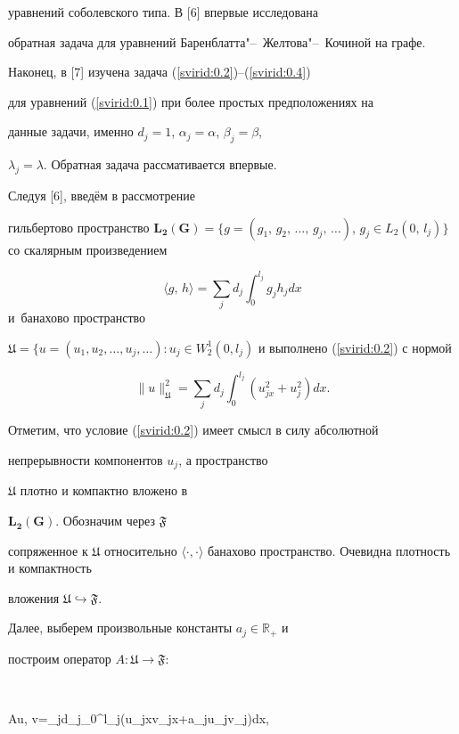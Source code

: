 уравнений соболевского типа. В [6] впервые исследована

обратная задача для уравнений Баренблатта"--~Желтова"--~Кочиной на графе.

Наконец, в [7] изучена задача (\ref{svirid:0.2})--(\ref{svirid:0.4})

для урав\-не\-ний (\ref{svirid:0.1}) при более простых предположениях на

данные задачи, именно $d_j=1$, $\alpha_j=\alpha$, $\beta_j=\beta$,

$\lambda_j=\lambda$. Обратная задача рассмативается впервые.





Следуя [6], введём в рассмотрение

гильбертово пространство $\mathbf{L_2(G)}=\{g=(g_1,\, g_2,\, \dots,\, g_j,\, \dots)$, $g_j\in L_2(0,\, l_j)\}$ со скалярным произведением

$$\langle g,\, h\rangle=\sum\limits_jd_j\int_0^{l_j}g_jh_jdx$$ и~банахово пространство

$\mathbf{\mathfrak{U}}=\{u=(u_1, u_2, \dots, u_j, \dots): u_j\in

W^1_2(0, l_j)$ и вы\-пол\-не\-но (\ref{svirid:0.2}) с нормой

$$\|u\|_{\mathbf{\mathfrak{U}}}^2=\sum\limits_jd_j\int_0^{l_j}(u^2_{jx}+u_j^2)dx.$$

Отметим, что условие (\ref{svirid:0.2}) имеет смысл в силу абсолютной

непрерывности ком\-по\-нен\-тов $u_j$, а пространство

$\mathbf{\mathfrak{U}}$ плотно и компактно вложено в

$\mathbf{L_2(G)}$. Обозначим через $\mathbb{\mathfrak{F}}$

сопряженное к $\mathbf{\mathfrak{U}}$ относительно $\langle\cdot,

\cdot\rangle$ банахово про\-стран\-ство. Очевидна плотность и компактность

вложения $\mathbf{\mathfrak{U}\hookrightarrow\mathfrak{F}}$.



Далее, выберем произвольные константы $a_j\in\mathbb{R}_+$ и

построим оператор $A:\mathfrak{U}\rightarrow\mathfrak{F}$:

$$

\langle Au, v\rangle=\sum\limits_jd_j\int\limits_0^{l_j}(u_{jx}v_{jx}+a_ju_jv_j)dx,

